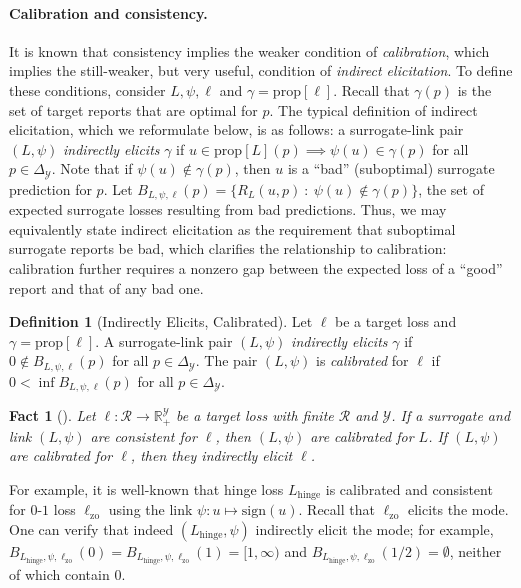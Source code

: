 \documentclass{article}
\newtheorem{fact}{Fact}
\theoremstyle{definition}\newtheorem{definition}{Definition}
\theoremstyle{definition}\newtheorem{assumption}{Assumption}
\newcommand{\reals}{\mathbb{R}}
\newcommand{\prop}[1]{\mathrm{prop}[#1]}
\newcommand{\simplex}{\Delta_\Y}
\newcommand{\R}{\mathcal{R}}
\newcommand{\Y}{\mathcal{Y}}
\newcommand{\hinge}{L_{\mathrm{hinge}}}
\newcommand{\zeroone}{\ell_{\mathrm{zo}}}
\newcommand{\sign}{\mathrm{sign}}
\begin{document}
\paragraph{Calibration and consistency.}
It is known that consistency implies the weaker condition of \emph{calibration}, which implies the still-weaker, but very useful, condition of \emph{indirect elicitation}.
To define these conditions, consider $L,\psi,\ell$ and $\gamma = \prop{\ell}$.
Recall that $\gamma(p)$ is the set of target reports that are optimal for $p$.
The typical definition of indirect elicitation, which we reformulate below, is as follows: a surrogate-link pair $(L,\psi)$ \emph{indirectly elicits} $\gamma$ if $u \in \prop{L}(p) \implies \psi(u) \in \gamma(p)$ for all $p \in \simplex$.
Note that if $\psi(u) \not\in \gamma(p)$, then $u$ is a ``bad'' (suboptimal) surrogate prediction for $p$.
Let $B_{L,\psi,\ell}(p) = \{R_L(u,p) ~:~ \psi(u) \not\in \gamma(p)\}$, the set of expected surrogate losses resulting from bad predictions.
Thus, we may equivalently state indirect elicitation as the requirement that suboptimal surrogate reports be bad, which clarifies the relationship to calibration:
calibration further requires a nonzero gap between the expected loss of a ``good'' report and that of any bad one.
\begin{definition}[Indirectly Elicits, Calibrated]
  Let $\ell$ be a target loss and $\gamma = \prop{\ell}$.
  A surrogate-link pair $(L,\psi)$ \emph{indirectly elicits} $\gamma$ if $0 \not\in B_{L,\psi,\ell}(p)$ for all $p \in \simplex$.
  The pair $(L,\psi)$ is \emph{calibrated} for $\ell$ if $0 < \inf B_{L,\psi,\ell}(p)$ for all $p \in \simplex$.
\end{definition}
\begin{fact}[\cite{bartlett2006convexity,steinwart2008support}]
  \label{fact:consistent-calibrated-elicits}
  Let $\ell: \R \to \reals_+^{\Y}$ be a target loss with finite $\R$ and $\Y$.
  If a surrogate and link $(L,\psi)$ are consistent for $\ell$, then $(L,\psi)$ are calibrated for $L$.
  If $(L,\psi)$ are calibrated for $\ell$, then they indirectly elicit $\ell$.
\end{fact}

For example, it is well-known that hinge loss $\hinge$ is calibrated and consistent for $0$-$1$ loss $\zeroone$ using the link $\psi : u\mapsto \sign(u)$.
Recall that $\zeroone$ elicits the mode.
One can verify that indeed $(\hinge,\psi)$ indirectly elicit the mode; for example, $B_{\hinge,\psi,\zeroone}(0) = B_{\hinge,\psi,\zeroone}(1) = [1,\infty)$ and $B_{\hinge,\psi,\zeroone}(1/2) = \emptyset$, neither of which contain $0$.
\end{document}
